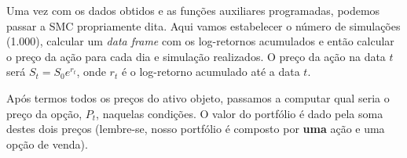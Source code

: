 \documentclass[]{book}
\newenvironment{Shaded}{\begin{snugshade}}{\end{snugshade}}
\newcommand{\KeywordTok}[1]{\textcolor[rgb]{0.13,0.29,0.53}{\textbf{#1}}}
\newcommand{\DataTypeTok}[1]{\textcolor[rgb]{0.13,0.29,0.53}{#1}}
\newcommand{\DecValTok}[1]{\textcolor[rgb]{0.00,0.00,0.81}{#1}}
\newcommand{\StringTok}[1]{\textcolor[rgb]{0.31,0.60,0.02}{#1}}
\newcommand{\CommentTok}[1]{\textcolor[rgb]{0.56,0.35,0.01}{\textit{#1}}}
\newcommand{\OperatorTok}[1]{\textcolor[rgb]{0.81,0.36,0.00}{\textbf{#1}}}
\newcommand{\NormalTok}[1]{#1}
\theoremstyle{definition}
\theoremstyle{definition}
\theoremstyle{definition}
\theoremstyle{remark}
\begin{document}
Uma vez com os dados obtidos e as funções auxiliares programadas,
podemos passar a SMC propriamente dita. Aqui vamos estabelecer o número
de simulações (1.000), calcular um \emph{data frame} com os log-retornos
acumulados e então calcular o preço da ação para cada dia e simulação
realizados. O preço da ação na data \(t\) será \(S_t=S_0 e^{r_t}\), onde
\(r_t\) é o log-retorno acumulado até a data \(t\).

Após termos todos os preços do ativo objeto, passamos a computar qual
seria o preço da opção, \(P_t\), naquelas condições. O valor do
portfólio é dado pela soma destes dois preços (lembre-se, nosso
portfólio é composto por \textbf{uma} ação e uma opção de venda).

\begin{Shaded}
\end{Shaded}
\end{document}
